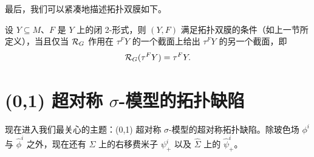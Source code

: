 最后，我们可以紧凑地描述拓扑双膜如下。

\begin{proposition}[5]
设 $Y\subseteq M$、$F$ 是 $Y$ 上的闭 2-形式，则 $(Y,F)$ 满足拓扑双膜的条件（如上一节所定义），当且仅当 $\mathcal{R}_G$ 作用在 $\tau^FY$ 的一个截面上给出 $\tau^FY$ 的另一个截面，即
\[
\mathcal{R}_G(\tau^FY)=\tau^FY.
\]
\end{proposition}

\section{(0,1) 超对称 \texorpdfstring{$\sigma$}{σ}-模型的拓扑缺陷}

现在进入我们最关心的主题：(0,1) 超对称 $\sigma$-模型的超对称拓扑缺陷。除玻色场 $\phi^i$ 与 $\hat\phi^i$ 之外，现在还有 $\Sigma$ 上的右移费米子 $\psi^i_+$ 以及 $\hat\Sigma$ 上的 $\hat\psi^i_+$。
